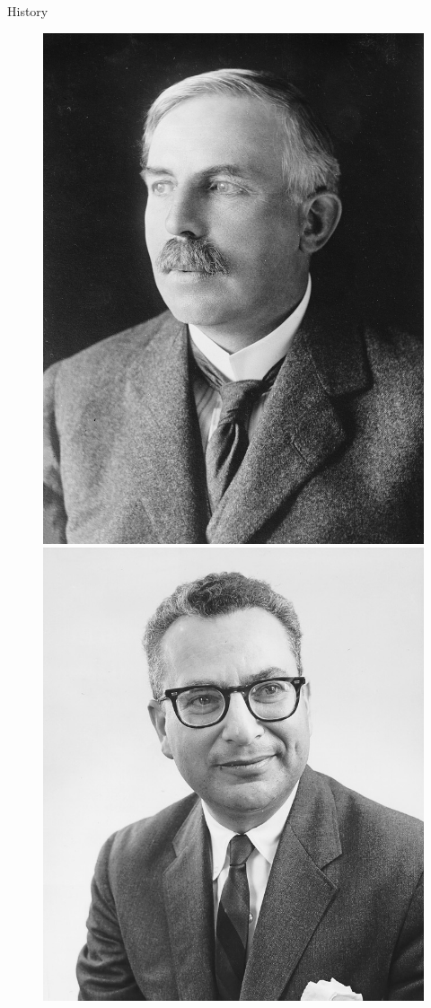 \documentclass{beamer}
\begin{document}
{\begin{frame}{History}
\begin{figure}
        \includegraphics[scale=0.51]{figures/Rutherford.jpg}
        \includegraphics[scale=0.1]{figures/Gell-Mann.jpg}

\end{figure}
\end{frame}}
\end{document}
